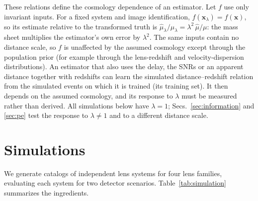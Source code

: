 These relations define the cosmology dependence of an estimator. Let $f$ use only invariant inputs. For a fixed system and image identification, $f(\boldsymbol x_\lambda)=f(\boldsymbol x)$, so its estimate relative to the transformed truth is $\hat\mu_\lambda/\mu_\lambda=\lambda^2\,\hat\mu/\mu$: the mass sheet multiplies the estimator's own error by $\lambda^2$. The same inputs contain no distance scale, so $f$ is unaffected by the assumed cosmology except through the population prior (for example through the lens-redshift and velocity-dispersion distributions). An estimator that also uses the delay, the SNRs or an apparent distance together with redshifts can learn the simulated distance--redshift relation from the simulated events on which it is trained (its training set). It then depends on the assumed cosmology, and its response to $\lambda$ must be measured rather than derived. All simulations below have $\lambda=1$; Secs.~\ref{sec:information} and \ref{sec:pe} test the response to $\lambda\neq1$ and to a different distance scale.

\section{Simulations}
\label{sec:simulation}
We generate catalogs of independent lens systems for four lens families, evaluating each system for two detector scenarios. Table~\ref{tab:simulation} summarizes the ingredients.

